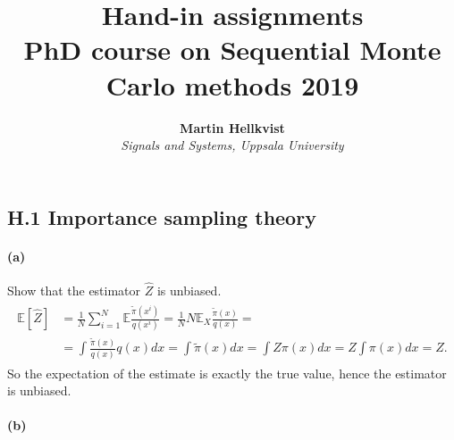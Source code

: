 \documentclass{article}
\title{Hand-in assignments \\ PhD course on Sequential Monte Carlo methods 2019}
\author{\textbf{Martin Hellkvist}\\
	 \textit{Signals and Systems, Uppsala University}}
\begin{document}
\maketitle
\subsection*{H.1 Importance sampling theory}
\paragraph{(a)} Show that the estimator $\hat{Z}$ is unbiased.
\begin{align}
	\begin{split}
	\mathbb{E}[\hat{Z}] &= \frac{1}{N}\sum_{i=1}^{N}\mathbb{E}\frac{\tilde{\pi}(x^i)}{q(x^i)} = \frac{1}{N}N\mathbb{E}_X\frac{\tilde{\pi}(x)}{q(x)} =\\
	&= \int \frac{\tilde{\pi}(x)}{q(x)}q(x)dx = \int \tilde{\pi}(x)dx = \int Z \pi(x) dx= Z\int\pi(x)dx = Z.
	\end{split}
\end{align}
So the expectation of the estimate is exactly the true value, hence the estimator is unbiased.

\paragraph{(b)}
\end{document}
